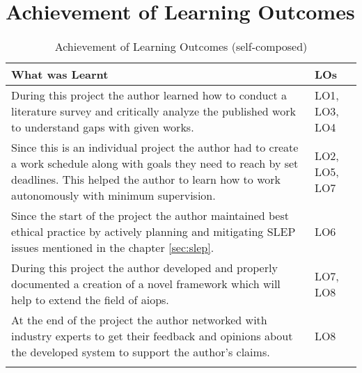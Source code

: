 \section{Achievement of Learning Outcomes}

\begin{longtable}{|p{135mm}|p{25mm}|}
    \hline
    \textbf{What was Learnt} & \textbf{LOs} \\ \hline
    During this project the author learned how to conduct a literature survey and critically analyze the published work to understand gaps with given works. & LO1, LO3, LO4 \\ \hline
    Since this is an individual project the author had to create a work schedule along with goals they need to reach by set deadlines. This helped the author to learn how to work autonomously with minimum supervision. & LO2, LO5, LO7 \\ \hline
    Since the start of the project the author maintained best ethical practice by actively planning and mitigating SLEP issues mentioned in the chapter \ref{sec:slep}. & LO6 \\ \hline
    During this project the author developed and properly documented a creation of a novel framework which will help to extend the field of \ac{aiops}. & LO7, LO8 \\ \hline
    At the end of the project the author networked with industry experts to get their feedback and opinions about the developed system to support the author's claims. & LO8 \\ \hline
    \caption{Achievement of Learning Outcomes (self-composed)}
  \end{longtable}
  